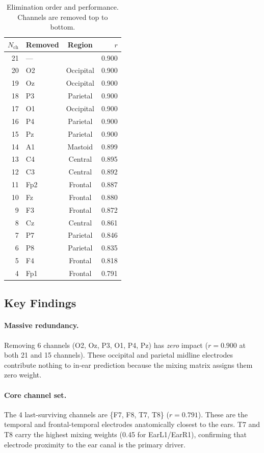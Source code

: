 \documentclass[11pt,a4paper]{article}
\begin{document}
\begin{table}[H]
\centering
\caption{Elimination order and performance. Channels are removed top to bottom.}
\begin{tabular}{rlcr}
\toprule
$N_\text{ch}$ & Removed & Region & $r$ \\
\midrule
21 & --- & & 0.900 \\
20 & O2 & Occipital & 0.900 \\
19 & Oz & Occipital & 0.900 \\
18 & P3 & Parietal & 0.900 \\
17 & O1 & Occipital & 0.900 \\
16 & P4 & Parietal & 0.900 \\
15 & Pz & Parietal & 0.900 \\
14 & A1 & Mastoid & 0.899 \\
13 & C4 & Central & 0.895 \\
12 & C3 & Central & 0.892 \\
11 & Fp2 & Frontal & 0.887 \\
10 & Fz & Frontal & 0.880 \\
9  & F3 & Frontal & 0.872 \\
8  & Cz & Central & 0.861 \\
7  & P7 & Parietal & 0.846 \\
6  & P8 & Parietal & 0.835 \\
5  & F4 & Frontal & \textcolor{good}{0.818} \\
4  & Fp1 & Frontal & 0.791 \\
\bottomrule
\end{tabular}
\end{table}

\subsection{Key Findings}

\paragraph{Massive redundancy.}
Removing 6 channels (O2, Oz, P3, O1, P4, Pz) has \emph{zero} impact
($r=0.900$ at both 21 and 15 channels). These occipital and parietal
midline electrodes contribute nothing to in-ear prediction because
the mixing matrix assigns them zero weight.

\paragraph{Core channel set.}
The 4 last-surviving channels are \{F7, F8, T7, T8\} ($r=0.791$).
These are the temporal and frontal-temporal electrodes anatomically
closest to the ears. T7 and T8 carry the highest mixing weights
(0.45 for EarL1/EarR1), confirming that electrode proximity to the
ear canal is the primary driver.
\end{document}
